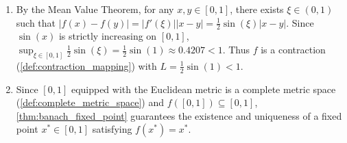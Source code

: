 \begin{exercisesolution}
\label{sol:ai_contraction_cos}
\begin{enumerate}[label=\textbf{(\alph*)}]
  \item By the Mean Value Theorem, for any $x, y \in [0,1]$, there exists $\xi \in (0,1)$ such that $|f(x) - f(y)| = |f'(\xi)| |x-y| = \frac{1}{2}\sin(\xi) |x-y|$. Since $\sin(x)$ is strictly increasing on $[0,1]$, $\sup_{\xi \in [0,1]} \frac{1}{2}\sin(\xi) = \frac{1}{2}\sin(1) \approx 0.4207 < 1$. Thus $f$ is a contraction (\cref{def:contraction_mapping}) with $L = \frac{1}{2}\sin(1) < 1$.
  \item Since $[0,1]$ equipped with the Euclidean metric is a complete metric space (\cref{def:complete_metric_space}) and $f([0,1]) \subseteq [0,1]$, \cref{thm:banach_fixed_point} guarantees the existence and uniqueness of a fixed point $x^* \in [0,1]$ satisfying $f(x^*) = x^*$.
\end{enumerate}
\end{exercisesolution}

